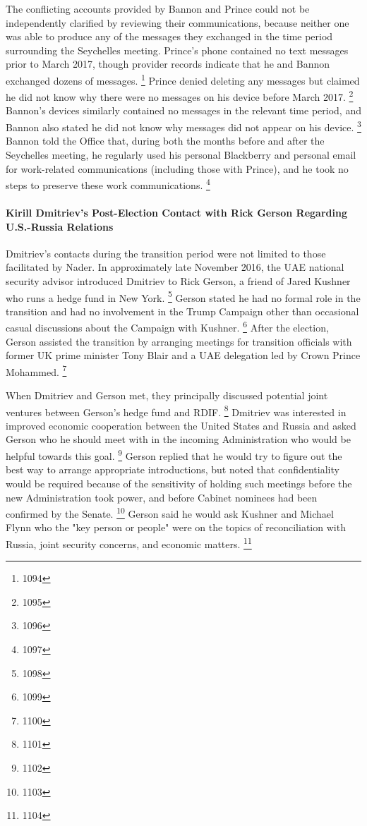 The conflicting accounts provided by Bannon and Prince could not be independently clarified by reviewing their communications, because neither one was able to produce any of the messages they exchanged in the time period surrounding the Seychelles meeting.
Prince's phone contained no text messages prior to March 2017, though provider records indicate that he and Bannon exchanged dozens of messages.%
\footnote{1094}
Prince denied deleting any messages but claimed he did not know why there were no messages on his device before March 2017.%
\footnote{1095}
Bannon's devices similarly contained no messages in the relevant time period, and Bannon also stated he did not know why messages did not appear on his device.%
\footnote{1096}
Bannon told the Office that, during both the months before and after the Seychelles meeting, he regularly used his personal Blackberry and personal email for work-related communications (including those with Prince), and he took no steps to preserve these work communications.%
\footnote{1097}

\paragraph{Kirill Dmitriev's Post-Election Contact with Rick Gerson Regarding U.S.-Russia Relations}

Dmitriev's contacts during the transition period were not limited to those facilitated by Nader.
In approximately late November 2016, the UAE national security advisor introduced Dmitriev to Rick Gerson, a friend of Jared Kushner who runs a hedge fund in New York.%
\footnote{1098}
Gerson stated he had no formal role in the transition and had no involvement in the Trump Campaign other than occasional casual discussions about the Campaign with Kushner.%
\footnote{1099}
After the election, Gerson assisted the transition by arranging meetings for transition officials with former UK prime minister Tony Blair and a UAE delegation led by Crown Prince Mohammed.%
\footnote{1100}

When Dmitriev and Gerson met, they principally discussed potential joint ventures between Gerson's hedge fund and RDIF.%
\footnote{1101}
Dmitriev was interested in improved economic cooperation between the United States and Russia and asked Gerson who he should meet with in the incoming Administration who would be helpful towards this goal.%
\footnote{1102}
Gerson replied that he would try to figure out the best way to arrange appropriate introductions, but noted that confidentiality would be required because of the sensitivity of holding such meetings before the new Administration took power, and before Cabinet nominees had been confirmed by the Senate.%
\footnote{1103}
Gerson said he would ask Kushner and Michael Flynn who the "key person or people" were on the topics of reconciliation with Russia, joint security concerns, and economic matters.%
\footnote{1104}

